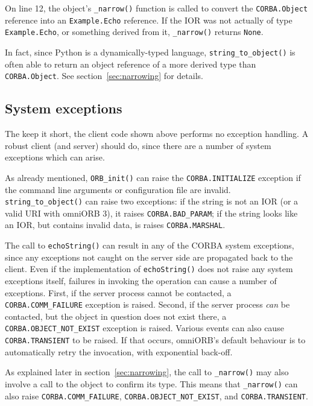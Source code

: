 \documentclass[11pt,twoside,a4paper]{book}
\newcommand{\type}[1]{\texttt{#1}}
\newcommand{\code}[1]{\texttt{#1}}
\newcommand{\op}[1]{\texttt{#1()}}
\newcommand{\dsc}{\discretionary{}{}{}}
\begin{document}
On line 12, the object's \op{\_narrow} function is called to convert
the \type{CORBA.\dsc{}Object} reference into an \type{Example.Echo}
reference. If the IOR was not actually of type \type{Example.Echo}, or
something derived from it, \op{\_narrow} returns \code{None}.

In fact, since Python is a dynamically-typed language,
\op{string\_to\_object} is often able to return an object reference of
a more derived type than \type{CORBA.\dsc{}Object}. See
section~\ref{sec:narrowing} for details.

\vspace{\baselineskip}%


\subsection{System exceptions}

The keep it short, the client code shown above performs no exception
handling. A robust client (and server) should do, since there are a
number of system exceptions which can arise.

As already mentioned, \op{ORB\_init} can raise the
\code{CORBA.INITIALIZE} exception if the command line arguments or
configuration file are invalid.  \op{string\_to\_\dsc{}object} can
raise two exceptions: if the string is not an IOR (or a valid URI with
omniORB 3), it raises \code{CORBA.BAD\_PARAM}; if the string looks
like an IOR, but contains invalid data, is raises
\code{CORBA.MARSHAL}.

The call to \op{echoString} can result in any of the CORBA system
exceptions, since any exceptions not caught on the server side are
propagated back to the client. Even if the implementation of
\op{echoString} does not raise any system exceptions itself, failures
in invoking the operation can cause a number of exceptions. First, if
the server process cannot be contacted, a \code{CORBA.COMM\_FAILURE}
exception is raised. Second, if the server process \emph{can} be
contacted, but the object in question does not exist there, a
\code{CORBA.OBJECT\_NOT\_EXIST} exception is raised. Various events
can also cause \code{CORBA.TRANSIENT} to be raised. If that occurs,
omniORB's default behaviour is to automatically retry the invocation,
with exponential back-off.

As explained later in section~\ref{sec:narrowing}, the call to
\op{\_narrow} may also involve a call to the object to confirm its
type. This means that \op{\_narrow} can also raise
\code{CORBA.COMM\_FAILURE}, \code{CORBA.OBJECT\_NOT\_EXIST}, and
\code{CORBA.TRANSIENT}.
\end{document}
